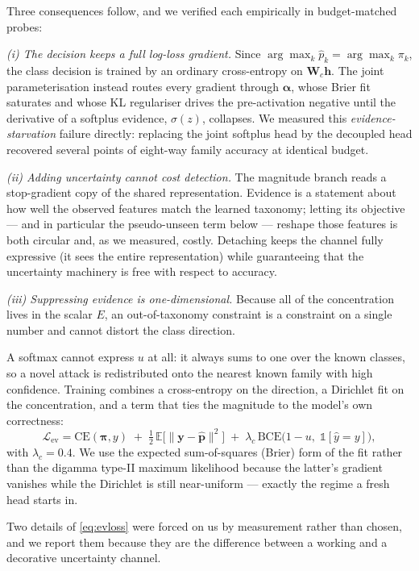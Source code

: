 \documentclass[conference]{IEEEtran}
\newcommand{\bs}[1]{\boldsymbol{#1}}
\begin{document}
Three consequences follow, and we verified each empirically in budget-matched
probes:

\emph{(i) The decision keeps a full log-loss gradient.} Since
$\arg\max_{k}\hat{p}_{k}=\arg\max_{k}\pi_{k}$, the class decision is trained by an
ordinary cross-entropy on $\bs{W}_{c}\bs{h}$. The joint parameterisation instead
routes every gradient through $\bs{\alpha}$, whose Brier fit saturates and whose KL
regulariser drives the pre-activation negative until the derivative of a softplus
evidence, $\sigma(z)$, collapses. We measured this \emph{evidence-starvation}
failure directly: replacing the joint softplus head by the decoupled head recovered
several points of eight-way family accuracy at identical budget.

\emph{(ii) Adding uncertainty cannot cost detection.} The magnitude branch reads a
stop-gradient copy of the shared representation. Evidence is a statement about how
well the observed features match the learned taxonomy; letting its objective --- and
in particular the pseudo-unseen term below --- reshape those features is both
circular and, as we measured, costly. Detaching keeps the channel fully expressive
(it sees the entire representation) while guaranteeing that the uncertainty
machinery is free with respect to accuracy.

\emph{(iii) Suppressing evidence is one-dimensional.} Because all of the
concentration lives in the scalar $E$, an out-of-taxonomy constraint is a
constraint on a single number and cannot distort the class direction.

A softmax cannot express $u$ at all: it always sums to one over the known classes,
so a novel attack is redistributed onto the nearest known family with high
confidence. Training combines a cross-entropy on the direction, a Dirichlet fit on
the concentration, and a term that ties the magnitude to the model's own
correctness:
\begin{equation}
\mathcal{L}_{\text{ev}} = \mathrm{CE}(\bs{\pi},y)
\;+\; \tfrac{1}{2}\,\mathbb{E}\bigl[\lVert \bs{y}-\hat{\bs{p}}\rVert^{2}\bigr]
\;+\; \lambda_{c}\,\mathrm{BCE}\bigl(1-u,\;\mathbb{1}[\hat{y}=y]\bigr),
\label{eq:evloss}
\end{equation}
with $\lambda_{c}=0.4$. We use the expected sum-of-squares (Brier) form of the fit
rather than the digamma type-II maximum likelihood because the latter's gradient
vanishes while the Dirichlet is still near-uniform --- exactly the regime a fresh
head starts in.

Two details of \eqref{eq:evloss} were forced on us by measurement rather than
chosen, and we report them because they are the difference between a working and a
decorative uncertainty channel.
\end{document}
